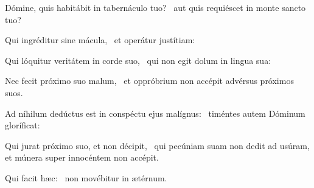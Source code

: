 \item Dómine, quis habitábit in tabernáculo tuo?~\psstar{} aut quis requiéscet in monte sancto tuo?

\item Qui ingréditur sine mácula,~\psstar{} et operátur justítiam:

\item Qui lóquitur veritátem in corde suo,~\psstar{} qui non egit dolum in lingua sua:

\item Nec fecit próximo suo malum,~\psstar{} et oppróbrium non accépit advérsus próximos suos.

\item Ad níhilum dedúctus est in conspéctu ejus malígnus:~\psstar{} timéntes autem Dóminum gloríficat:

\item Qui jurat próximo suo, et non décipit,~\psstar{} qui pecúniam suam non dedit ad usúram, et múnera super innocéntem non accépit.

\item Qui facit hæc:~\psstar{} non movébitur in ætérnum.

